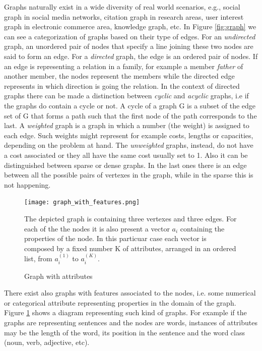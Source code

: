 Graphs naturally exist in a wide diversity of real world scenarios, e.g., social graph in social media networks, citation graph in research areas, user interest graph in electronic commerce area, knowledge graph, etc. In Figure \ref{fig:graph} we can see a categorization of graphs based on their type of edges. For an \textit{undirected} graph, an unordered pair of nodes that specify a line joining these two nodes are said to form an edge. For a \textit{directed} graph, the edge is an ordered pair of nodes. If an edge is representing a relation in a family, for example a member \textit{father} of another member, the nodes represent the members while the directed edge represents in which direction is going the relation. In the context of directed graphs there can be made a distinction between \textit{cyclic} and \textit{acyclic} graphs, i.e if the graphs do contain a cycle or not. A cycle of a graph G is a subset of the edge set of G that forms a path such that the first node of the path corresponds to the last. A \textit{weighted} graph is a graph in which a number (the weight) is assigned to each edge. Such weights might represent for example costs, lengths or capacities, depending on the problem at hand. The \textit{unweighted} graphs, instead, do not have a cost associated or they all have the same cost usually set to 1. Also it can be distinguished between sparse or dense graphs. In the last ones there is an edge between all the possible pairs of vertexes in the graph, while in the sparse this is not happening.

\begin{figure}
\texttt{[image: graph\_with\_features.png]}
\centering
\caption{Graph with attributes}
The depicted graph is containing three vertexes and three edges. For each of the the nodes it is also present a vector \(a_i\) containing the properties of the node. In this particuar case each vector is composed by a fixed number K of attributes, arranged in an ordered list, from \(a_i^{(1)}\) to \(a_i^{(K)}\).
\label{fig:graph_with_attributes}
\end{figure}

There exist also graphs with features associated to the nodes, i.e. some numerical or categorical attribute representing properties in the domain of the graph. Figure \ref{fig:graph_with_attributes} shows a diagram representing such kind of graphs. 
For example if the graphs are representing sentences and the nodes are words, instances of attributes may be the length of the word, its position in the sentence and the word class (noun, verb, adjective, etc).

